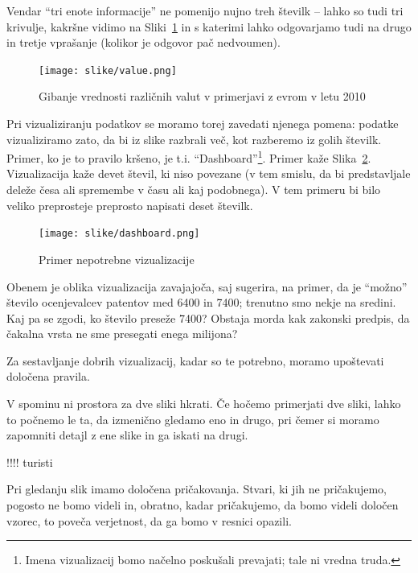 Vendar ``tri enote informacije'' ne pomenijo nujno treh številk – lahko so tudi tri krivulje, kakršne vidimo na Sliki~\ref{f-valute} in s katerimi lahko odgovarjamo tudi na drugo in tretje vprašanje (kolikor je odgovor pač nedvoumen).

\begin{figure}[htbp]
\begin{center}
\texttt{[image: slike/value.png]}
\caption{Gibanje vrednosti različnih valut v primerjavi z evrom v letu 2010}
\label{f-valute}
\end{center}
\end{figure}

Pri vizualiziranju podatkov se moramo torej zavedati njenega pomena: podatke vizualiziramo zato, da bi iz slike razbrali več, kot razberemo iz golih številk. Primer, ko je to pravilo kršeno, je t.i. ``Dashboard''\footnote{Imena vizualizacij bomo načelno poskušali prevajati; tale ni vredna truda.}. Primer kaže Slika~\ref{f-dashboard}. Vizualizacija kaže devet števil, ki niso povezane (v tem smislu, da bi predstavljale deleže česa ali spremembe v času ali kaj podobnega). V tem primeru bi bilo veliko preprosteje preprosto napisati deset številk.

\begin{figure}[htbp]
\begin{center}
\texttt{[image: slike/dashboard.png]}
\caption{Primer nepotrebne vizualizacije}
\label{f-dashboard}
\end{center}
\end{figure}

Obenem je oblika vizualizacija zavajajoča, saj sugerira, na primer, da je ``možno'' število ocenjevalcev patentov med 6400 in 7400; trenutno smo nekje na sredini. Kaj pa se zgodi, ko število preseže 7400? Obstaja morda kak zakonski predpis, da čakalna vrsta ne sme presegati enega milijona?

Za sestavljanje dobrih vizualizacij, kadar so te potrebno, moramo upoštevati določena pravila.

V spominu ni prostora za dve sliki hkrati. Če hočemo primerjati dve sliki, lahko to počnemo le ta, da izmenično gledamo eno in drugo, pri čemer si moramo zapomniti detajl z ene slike in ga iskati na drugi.

!!!! turisti

Pri gledanju slik imamo določena pričakovanja. Stvari, ki jih ne pričakujemo, pogosto ne bomo videli in, obratno, kadar pričakujemo, da bomo videli določen vzorec, to poveča verjetnost, da ga bomo v resnici opazili.

